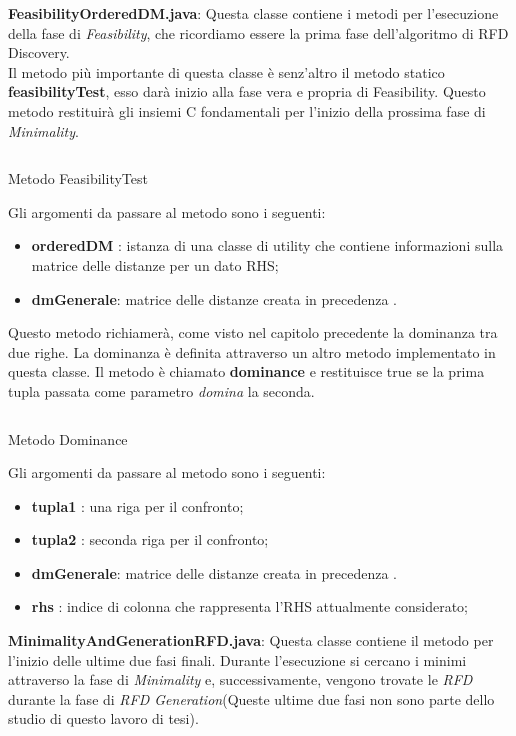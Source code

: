 \textbf{FeasibilityOrderedDM.java}:
Questa classe contiene i metodi per l'esecuzione della fase di \emph{Feasibility}, che ricordiamo essere la prima fase dell'algoritmo di RFD Discovery.\\
Il metodo più importante di questa classe è senz'altro il metodo statico \textbf{feasibilityTest}, esso darà inizio alla fase vera e propria di Feasibility.
Questo metodo restituirà gli insiemi C fondamentali per l'inizio della prossima fase di \emph{Minimality}.
\begin{listing}[H]
	\inputminted[]{java}{Codici/FeasibilityTest.java}
	\caption{Metodo FeasibilityTest}
	\label{Code:4}
\end{listing}
Gli argomenti da passare al metodo sono i seguenti:
\begin{itemize}
	\item \textbf{orderedDM} : istanza di una classe di utility che contiene informazioni sulla matrice delle distanze per un dato RHS;
	\item \textbf{dmGenerale}: matrice delle distanze creata in precedenza .
\end{itemize}
Questo metodo richiamerà, come visto nel capitolo precedente la dominanza tra due righe.
La dominanza è definita attraverso un altro metodo implementato in questa classe.
Il metodo è chiamato \textbf{dominance} e restituisce true se la prima tupla passata come parametro \emph{domina} la seconda.
\begin{listing}[H]
	\inputminted[]{java}{Codici/Dominance.java}
	\caption{Metodo Dominance}
	\label{Code:5}
\end{listing}
Gli argomenti da passare al metodo sono i seguenti:
\begin{itemize}
	\item \textbf{tupla1} : una riga per il confronto;
	\item \textbf{tupla2} : seconda riga per il confronto;
	\item \textbf{dmGenerale}: matrice delle distanze creata in precedenza .
	\item \textbf{rhs} : indice di colonna che rappresenta l'RHS attualmente considerato;
\end{itemize}
\textbf{MinimalityAndGenerationRFD.java}:
Questa classe contiene il metodo per l'inizio delle ultime due fasi finali.
Durante l'esecuzione si cercano i minimi attraverso la fase di \emph{Minimality} e, successivamente, vengono trovate le \emph{RFD} durante la fase di \emph{RFD Generation}(Queste ultime due fasi non sono parte dello studio di questo lavoro di tesi).
